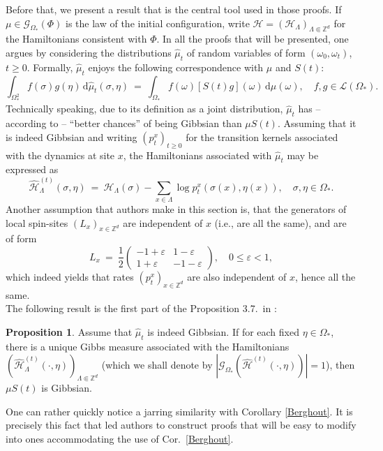 \documentclass[12pt]{article}
\renewcommand{\d}{\mathrm{d}}
\newcommand{\G}{\mathcal{G}}
\renewcommand{\H}{\mathcal{H}}
\newcommand{\Loc}{\mathcal{L}}
\newcommand{\Z}{\mathbb{Z}}
\newcommand{\pika}{\boldsymbol{\cdot}}
\newcommand{\1}{\mathbbm{1}}
\newcommand{\5}{\vspace{0.5cm}}
\renewcommand{\hat}{\widehat}
\theoremstyle{definition}
\newtheorem{prop}[thm]{Proposition}
\begin{document}
Before that, we present a result that is the central tool used in those proofs. If $\mu\in\G_{\Omega_*}(\Phi)$ is the law of the initial configuration, write $\H=(\H_\Lambda)_{\Lambda\Subset\Z^d}$ for the Hamiltonians consistent with $\Phi$. In all the proofs that will be presented, one argues by considering the distributions $\hat{\mu}_t$ of random variables of form $(\omega_0,\omega_t)$, $t\geq 0$. Formally, $\hat{\mu}_t$ enjoys the following correspondence with $\mu$ and $S(t)$:
$$\int_{\Omega_*^2} f(\sigma)g(\eta)\,\d\hat{\mu}_t(\sigma,\eta) ~=~ \int_{\Omega_*}f(\omega)[S(t)g](\omega)\,\d\mu(\omega), \quad f,g\in\Loc(\Omega_*).$$
Technically speaking, due to its definition as a joint distribution, $\hat{\mu}_t$ has -- according to \cite{EFHR} -- ``better chances'' of being Gibbsian than $\mu S(t)$. Assuming that it is indeed Gibbsian and writing $(p_t^x)_{t\geq 0}$ for the transition kernels associated with the dynamics at site $x$, the Hamiltonians associated with $\hat{\mu}_t$ may be expressed as
$$\hat{\H}_\Lambda^{(t)}(\sigma,\eta) ~=~ \H_\Lambda(\sigma) - \sum_{x\in\Lambda}\log p_t^x(\sigma(x),\eta(x)), \quad \sigma,\eta\in\Omega_*.$$
Another assumption that authors make in this section is, that the generators of local spin-sites $(L_x)_{x\in\Z^d}$ are independent of $x$ (i.e., are all the same), and are of form
$$L_x ~=~ \frac{1}{2}\begin{pmatrix}
-1+\varepsilon & 1-\varepsilon \\
1+\varepsilon & -1-\varepsilon
\end{pmatrix}, \quad 0\leq \varepsilon<1,$$
which indeed yields that rates $(p_t^x)_{x\in\Z^d}$ are also independent of $x$, hence all the same.\\

The following result is the first part of the Proposition 3.7.~in \cite{EFHR}:
\begin{prop}\label{BerghoutAnalogue}
Assume that $\hat{\mu}_t$ is indeed Gibbsian. If for each fixed $\eta\in\Omega_*$, there is a unique Gibbs measure associated with the Hamiltonians $(\hat{\H}_\Lambda^{(t)}(\pika,\eta))_{\Lambda\Subset\Z^d}$ (which we shall denote by $|\G_{\Omega_*}(\hat{\H}^{(t)}(\pika,\eta))|=1$), then $\mu S(t)$ is Gibbsian.
\end{prop}
One can rather quickly notice a jarring similarity with Corollary \ref{Berghout}. It is precisely this fact that led authors to construct proofs that will be easy to modify into ones accommodating the use of Cor.~\ref{Berghout}. \\
\end{document}
